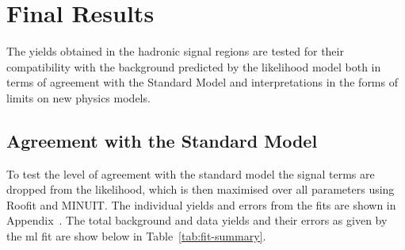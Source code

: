 \section{Final Results} %
\label{sec:final_results}
The yields obtained in the hadronic signal regions are tested for their 
compatibility with the background predicted by the likelihood model both in 
terms of agreement with the Standard Model and interpretations in the forms of 
limits on new physics models.
\subsection{Agreement with the Standard Model} %
\label{sub:agreement_with_the_standard_model}
To test the level of agreement with the standard model the signal terms are 
dropped from the likelihood, which is then maximised over all parameters using 
Roofit\cite{ROOSTATS} and MINUIT\cite{MINOS}. The individual yields and errors from the fits are shown in Appendix~. The total background and data yields and their 
errors as given by the \ac{ml} fit are show below in Table~\ref{tab:fit-summary}.

